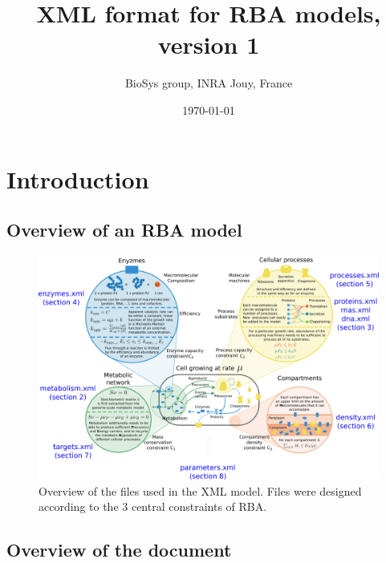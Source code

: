 \documentclass[12pt]{scrartcl}
\begin{document}
\title{XML format for RBA models, version 1}
\author{BioSys group, INRA Jouy, France}
\date{\today}

\maketitle

\newpage

\tableofcontents

\newpage

\section{Introduction}

\subsection{Overview of an RBA model}

\begin{figure}
  \includegraphics[width=\linewidth]{overview}
  \caption{Overview of the files used in the XML model.
  Files were designed according to the 3 central constraints of RBA.}
  \label{fig:overview}
\end{figure}

\subsection{Overview of the document}
\end{document}
